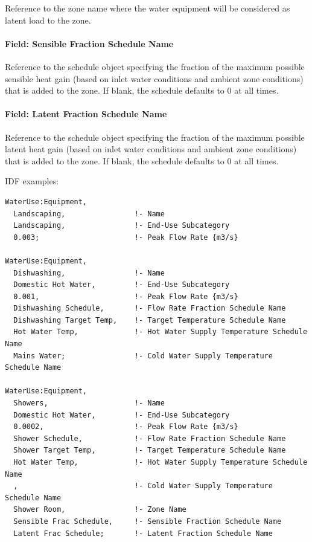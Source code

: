 Reference to the zone name where the water equipment will be considered as latent load to the zone.

\paragraph{Field: Sensible Fraction Schedule Name}\label{field-sensible-fraction-schedule-name}

Reference to the schedule object specifying the fraction of the maximum possible sensible heat gain (based on inlet water conditions and ambient zone conditions) that is added to the zone. If blank, the schedule defaults to 0 at all times.

\paragraph{Field: Latent Fraction Schedule Name}\label{field-latent-fraction-schedule-name}

Reference to the schedule object specifying the fraction of the maximum possible latent heat gain (based on inlet water conditions and ambient zone conditions) that is added to the zone. If blank, the schedule defaults to 0 at all times.

IDF examples:

\begin{lstlisting}
WaterUse:Equipment,
  Landscaping,                !- Name
  Landscaping,                !- End-Use Subcategory
  0.003;                      !- Peak Flow Rate {m3/s}

WaterUse:Equipment,
  Dishwashing,                !- Name
  Domestic Hot Water,         !- End-Use Subcategory
  0.001,                      !- Peak Flow Rate {m3/s}
  Dishwashing Schedule,       !- Flow Rate Fraction Schedule Name
  Dishwashing Target Temp,    !- Target Temperature Schedule Name
  Hot Water Temp,             !- Hot Water Supply Temperature Schedule Name
  Mains Water;                !- Cold Water Supply Temperature Schedule Name

WaterUse:Equipment,
  Showers,                    !- Name
  Domestic Hot Water,         !- End-Use Subcategory
  0.0002,                     !- Peak Flow Rate {m3/s}
  Shower Schedule,            !- Flow Rate Fraction Schedule Name
  Shower Target Temp,         !- Target Temperature Schedule Name
  Hot Water Temp,             !- Hot Water Supply Temperature Schedule Name
  ,                           !- Cold Water Supply Temperature Schedule Name
  Shower Room,                !- Zone Name
  Sensible Frac Schedule,     !- Sensible Fraction Schedule Name
  Latent Frac Schedule;       !- Latent Fraction Schedule Name
\end{lstlisting}


